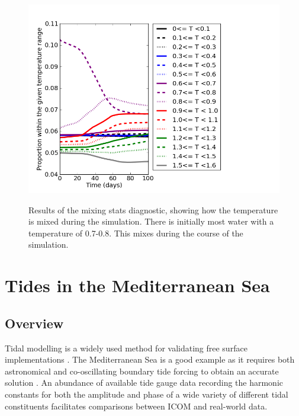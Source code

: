 \begin{figure}[h!]
\begin{center}
{\includegraphics[width=12cm]{examples_images/restratification_after_oodc/mixing_stats.png}}
\label{fig:rousset-mixing}
\caption{Results of the mixing stats diagnostic, showing how the temperature is mixed during the simulation. There is initially most water with a temperature of 0.7-0.8. This mixes during the course of the simulation.  }
\end{center}
\end{figure}





\section{Tides in the Mediterranean Sea}
\label{sec:tides_in_the_med}

\subsection{Overview}

Tidal modelling is a widely used method for validating free surface implementations \citep{Shum1997}. The Mediterranean Sea
is a good example as it requires both astronomical and co-oscillating boundary tide forcing to obtain
an accurate solution \citep{Tsimplis1995, Wells2008}. An abundance of available tide gauge data recording the 
harmonic constants for both the amplitude and phase of a wide variety of different tidal constituents
facilitates comparisons between ICOM and real-world data. 
 

